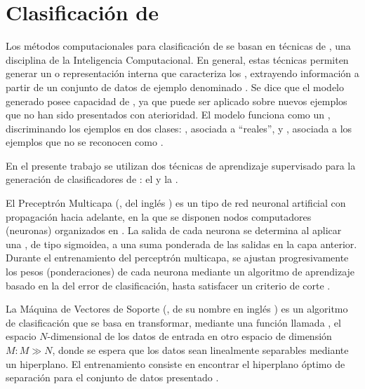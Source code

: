 %
%
%
\section{Clasificación de }
%
Los métodos computacionales para clasificación de  se
basan en técnicas de , una disciplina de la
Inteligencia Computacional.
En general, estas técnicas permiten generar un  o
representación interna que caracteriza los , extrayendo
información a partir de un conjunto de datos de ejemplo denominado
.
Se dice que el modelo generado posee capacidad de ,
ya que puede ser aplicado sobre nuevos ejemplos que no han sido
presentados con aterioridad.
El modelo funciona como un , discriminando los
ejemplos en dos clases: , asociada a 
``reales'', y , asociada a los ejemplos que no se
reconocen como .

En el presente trabajo se utilizan dos técnicas de aprendizaje
supervisado para la generación de clasificadores de : el
 \cite{mlp1,mlp2} y la  \cite{svm}.

El Preceptrón Multicapa (, del inglés ) es un tipo de red neuronal artificial con propagación
hacia adelante, en la que se disponen nodos computadores (neuronas)
organizados en .
La salida de cada neurona se determina al aplicar una , de tipo sigmoidea, a una suma ponderada de las salidas
en la capa anterior.
Durante el entrenamiento del perceptrón multicapa, se ajustan
progresivamente los pesos (ponderaciones) de cada neurona mediante un
algoritmo de aprendizaje basado en la  del
error de clasificación, hasta satisfacer un criterio de corte
\cite{jain}.

La Máquina de Vectores de Soporte (, de su nombre en inglés
) es un algoritmo de clasificación que se
basa en transformar, mediante una función llamada , el
espacio $N$-dimensional de los datos de entrada en otro espacio de
dimensión $M: M\gg N$, donde se espera que los datos sean linealmente
separables mediante un hiperplano.
El entrenamiento consiste en encontrar el hiperplano óptimo de
separación para el conjunto de datos presentado \cite{bottou}.

